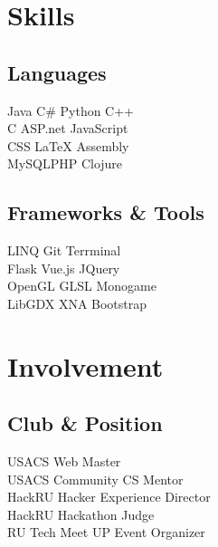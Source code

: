 \documentclass[]{deedy-resume-openfont}
\begin{document}
\begin{minipage}[t]{0.33\textwidth}

\section{Skills}
\subsection{Languages}
Java \textbullet{} C\# \textbullet{} Python \textbullet{} C++ \\
C \textbullet{} ASP.net \textbullet{} JavaScript \\ 
CSS \textbullet{} \LaTeX \textbullet{} Assembly \\
MySQL\textbullet{}PHP \textbullet{}Clojure\\
\sectionsep
\sectionsep
\subsection{Frameworks \& Tools}
LINQ\textbullet{}  Git  \textbullet{} Terrminal\\
Flask\textbullet{} Vue.js\textbullet{} JQuery \\ 
OpenGL \textbullet{} GLSL \textbullet{} Monogame \\
LibGDX \textbullet{} XNA \textbullet{} Bootstrap\\
\sectionsep


\section{Involvement} 
\subsection{Club \& Position }
USACS\textbullet{} Web Master \\ 
USACS\textbullet{} Community CS Mentor \\ 
HackRU \textbullet{} Hacker Experience Director \\
HackRU  \textbullet{} Hackathon Judge \\
RU Tech Meet UP\textbullet{} Event Organizer \\ 
\sectionsep

%
%

\end{minipage} 
\end{document}
